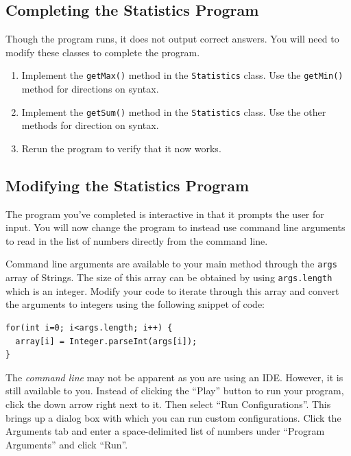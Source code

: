 \documentclass[12pt]{scrartcl}
\begin{document}
\subsection{Completing the Statistics Program}

Though the program runs, it does not output correct answers.  You 
will need to modify these classes to complete the program.
\begin{enumerate}
  \item Implement the \texttt{getMax()} method in the 
  	\texttt{Statistics} class.  Use the \texttt{getMin()}
	method for directions on syntax.
  \item Implement the \texttt{getSum()} method in the 
  	\texttt{Statistics} class.  Use the other methods for 
	direction on syntax.
  \item Rerun the program to verify that it now works.
\end{enumerate}

\subsection{Modifying the Statistics Program}

The program you've completed is interactive in that it prompts the 
user for input.  You will now change the program to instead use command 
line arguments to read in the list of numbers directly from the command 
line.

Command line arguments are available to your main method through 
the \texttt{args} array of Strings.  The size of this array 
can be obtained by using \texttt{args.length} which is an
integer.  Modify your code to iterate through this array and convert 
the arguments to integers using the following snippet of code:

\begin{verbatim}
for(int i=0; i<args.length; i++) {
  array[i] = Integer.parseInt(args[i]);
}
\end{verbatim}

The \emph{command line} may not be apparent as you are using an IDE.  
However, it is still available to you.  Instead of clicking the ``Play'' 
button to run your program, click the down arrow right next to it.  
Then select ``Run Configurations''.  This brings up a dialog box with 
which you can run custom configurations.  Click the Arguments tab and 
enter a space-delimited list of numbers under ``Program Arguments''
and click ``Run''.
\end{document}
